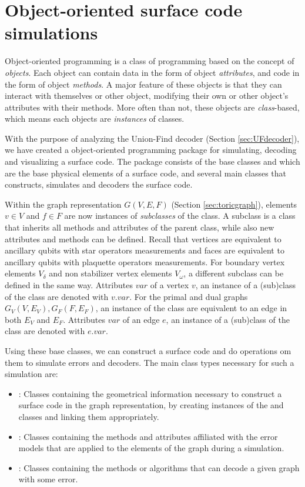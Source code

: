 \chapter{Object-oriented surface code simulations}
Object-oriented programming is a class of programming based on the concept of \emph{objects}. Each object can contain data in the form of object \emph{attributes}, and code in the form of object \emph{methods}. A major feature of these objects is that they can interact with themselves or other object, modifying their own or other object's attributes with their methods. More often than not, these objects are \emph{class}-based, which means each objects are \emph{instances} of classes. 

With the purpose of analyzing the Union-Find decoder (Section \ref{sec:UFdecoder}), we have  created a object-oriented programming package for simulating, decoding and visualizing a surface code. The package consists of the base classes  and  which are the base physical elements of a surface code, and several main classes that constructs, simulates and decoders the surface code. 

Within the graph representation $G(V,E,F)$ (Section \ref{sec:toricgraph}), elements $v\in V$ and $f\in F$ are now instances of \emph{subclasses} of the  class. A subclass is a class that inherits all methods and attributes of the parent class, while also new attributes and methods can be defined. Recall that vertices are equivalent to ancillary qubits with star operators measurements and faces are equivalent to ancillary qubits with plaquette operators measurements. For boundary vertex elements $V_\delta$ and non stabilizer vertex elements $V_\omega$, a different subclass can be defined in the same way. Attributes $var$ of a vertex $v$, an instance of a (sub)class of the  class are denoted with $v.var$. For the primal and dual graphs $G_V(V,E_V), G_F(F,E_F)$, an instance of the  class are equivalent to an edge in both $E_V$ and $E_F$. Attributes $var$ of an edge $e$, an instance of a (sub)class of the  class are denoted with $e.var$. 

Using these base classes, we can construct a surface code and do operations om them to simulate errors and decoders. The main class types necessary for such a simulation are:
\begin{itemize}
    \item {}: Classes containing the geometrical information necessary to construct a surface code in the graph representation, by creating instances of the  and  classes and linking them appropriately.
    \item {}: Classes containing the methods and attributes affiliated with the error models that are applied to the elements of the graph during a simulation.
    \item {}: Classes containing the methods or algorithms that can decode a given graph with some error. 
\end{itemize}

